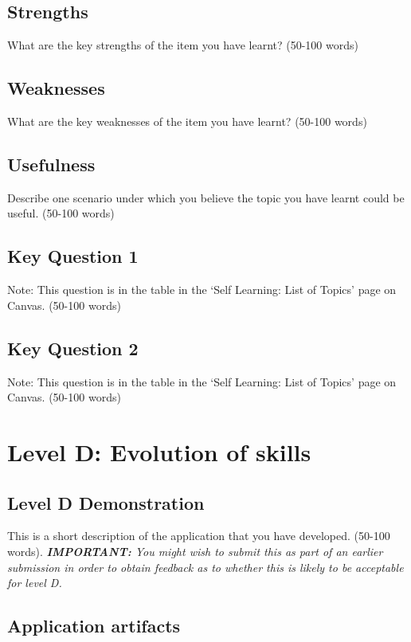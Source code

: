 \documentclass[a4paper, 11pt]{report}
\begin{document}
\subsection{Strengths}
What are the key strengths of the item you have learnt? (50-100 words)

\subsection{Weaknesses}
What are the key weaknesses of the item you have learnt? (50-100 words)

\subsection{Usefulness}
Describe one scenario under which you believe the topic you have learnt could be useful. (50-100 words)

\subsection{Key Question 1}
Note: This question is in the table in the ‘Self Learning: List of Topics’ page on Canvas. (50-100 words)

\subsection{Key Question 2}
Note: This question is in the table in the ‘Self Learning: List of Topics’ page on Canvas. (50-100 words)



\newpage
\section{Level D: Evolution of skills}
\vspace{5mm}
\subsection{Level D Demonstration}

This is a short description of the application that you have developed. (50-100 words).
\textit{{\bf IMPORTANT:} You might wish to submit this as part of an earlier submission in order to obtain feedback as to whether this is likely to be acceptable for level D.}

\subsection{Application artifacts}
\end{document}
